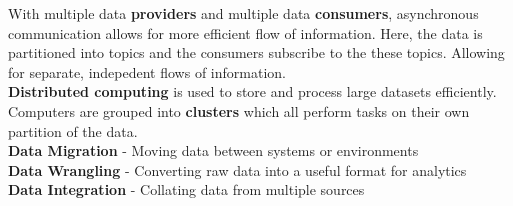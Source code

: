 With multiple data \textbf{providers} and multiple data \textbf{consumers}, asynchronous 
communication allows for more efficient flow of information. Here, the data is partitioned into
topics and the consumers subscribe to the these topics. Allowing for separate, indepedent flows 
of information.\\

\textbf{Distributed computing} is used to store and process large datasets efficiently. Computers
are grouped into \textbf{clusters} which all perform tasks on their own partition of the data.\\

\textbf{Data Migration} - Moving data between systems or environments\\

\textbf{Data Wrangling} - Converting raw data into a useful format for analytics\\

\textbf{Data Integration} - Collating data from multiple sources\\